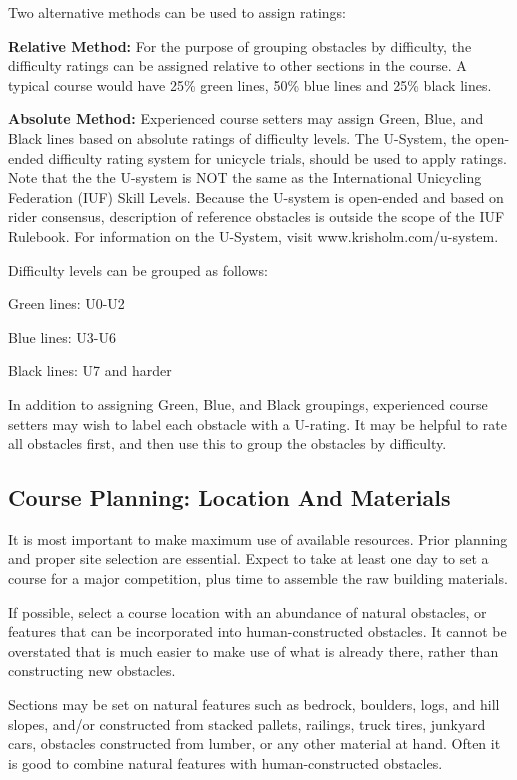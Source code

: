Two alternative methods can be used to assign ratings:

\textbf{Relative Method:}
For the purpose of grouping obstacles by difficulty, the difficulty ratings can be assigned relative to other sections in the course.
A typical course would have 25\% green lines, 50\% blue lines and 25\% black lines.

\textbf{Absolute Method:}
Experienced course setters may assign Green, Blue, and Black lines based on absolute ratings of difficulty levels.
The U-System, the open-ended difficulty rating system for unicycle trials, should be used to apply ratings.
Note that the the U-system is NOT the same as the International Unicycling Federation (IUF) Skill Levels.
Because the U-system is open-ended and based on rider consensus, description of reference obstacles is outside the scope of the IUF Rulebook.
For information on the U-System, visit www.krisholm.com/u-system.

Difficulty levels can be grouped as follows:

Green lines: U0-U2

Blue lines: U3-U6 

Black lines: U7 and harder

In addition to assigning Green, Blue, and Black groupings, experienced course setters may wish to label each obstacle with a U-rating.
It may be helpful to rate all obstacles first, and then use this to group the obstacles by difficulty.

\subsection{Course Planning: Location And Materials}
It is most important to make maximum use of available resources.
Prior planning and proper site selection are essential.
Expect to take at least one day to set a course for a major competition, plus time to assemble the raw building materials.

If possible, select a course location with an abundance of natural obstacles, or features that can be incorporated into human-constructed obstacles.
It cannot be overstated that is much easier to make use of what is already there, rather than constructing new obstacles.

Sections may be set on natural features such as bedrock, boulders, logs, and hill slopes, and/or constructed from stacked pallets, railings, truck tires, junkyard cars, obstacles constructed from lumber, or any other material at hand.
Often it is good to combine natural features with human-constructed obstacles.

